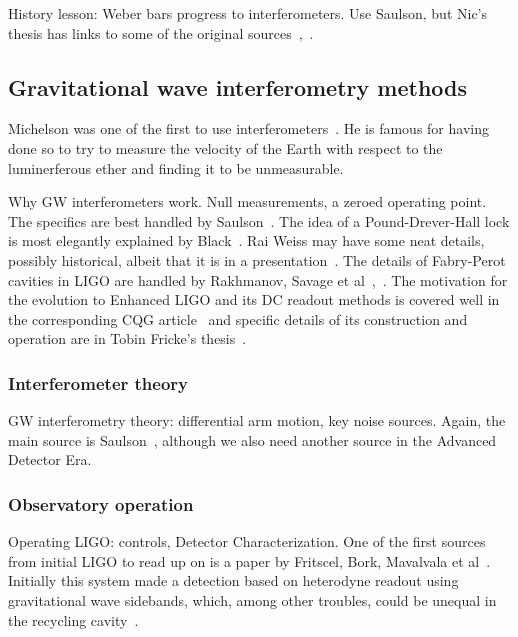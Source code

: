             History lesson: Weber bars progress to interferometers. Use Saulson, but Nic's thesis has links to some of the original sources~\cite{Saulson},~\cite{SmithThesis}.           

        \subsection{Gravitational wave interferometry methods}
        \label{methods}

		Michelson was one of the first to use interferometers~\cite{michelson}. He is famous for having done so to try to measure the velocity of the Earth with respect to the luminerferous ether and finding it to be unmeasurable.

            Why GW interferometers work. Null measurements, a zeroed operating point. The specifics are best handled by Saulson~\cite{Saulson}. The idea of a Pound-Drever-Hall lock is most elegantly explained by Black~\cite{PDHNotes}. Rai Weiss may have some neat details, possibly historical, albeit that it is in a presentation~\cite{LIGOWorks}. The details of Fabry-Perot cavities in LIGO are handled by Rakhmanov, Savage et al~\cite{ResonanceFP},~\cite{ResponsesFP}. The motivation for the evolution to Enhanced LIGO and its DC readout methods is covered well in the corresponding CQG article~\cite{Fricke2009} and specific details of its construction and operation are in Tobin Fricke's thesis~\cite{FrickeThesis}.

            \subsubsection{Interferometer theory}
            \label{interferometer_theory}
        
                GW interferometry theory: differential arm motion, key noise sources. Again, the main source is Saulson~\cite{Saulson}, although we also need another source in the Advanced Detector Era.

            \subsubsection{Observatory operation}
            \label{observatory_operation}

                Operating LIGO: controls, Detector Characterization. One of the first sources from initial LIGO to read up on is a paper by Fritscel, Bork, Mavalvala et al~\cite{ReadoutGWA}. Initially this system made a detection based on heterodyne readout using gravitational wave sidebands, which, among other troubles, could be unequal in the recycling cavity~\cite{MeadorsHanford2005}.

